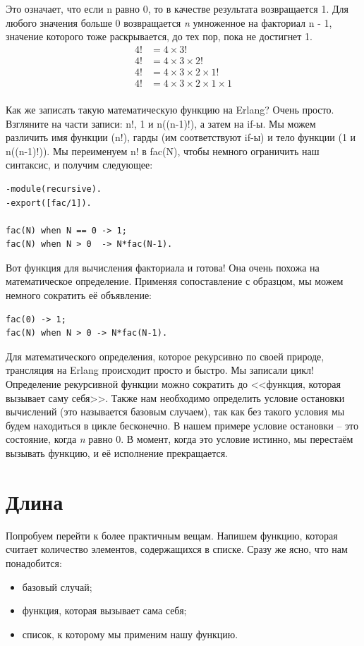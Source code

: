 \documentclass[a4paper,12pt]{report}
\newcommand{\ops}{\colorbox{lgreen}}
\begin{document}
Это означает, что если n равно 0, то в качестве результата возвращается 1. Для любого значения больше 0 возвращается \emph{n} умноженное на факториал \ops{n - 1}, значение которого тоже раскрывается, до тех пор, пока не достигнет 1.
\begin{align*}
4! &= 4 \times 3! \\
4! &= 4 \times 3 \times 2! \\
4! &= 4 \times 3 \times 2 \times 1! \\
4! &= 4 \times 3 \times 2 \times 1 \times 1 \\
\end{align*}

Как же записать такую математическую функцию на Erlang? Очень просто. Взгляните на части записи: \ops{n!}, 1 и \ops{n((n-1)!)}, а затем на \ops{if}\--ы. Мы можем различить имя функции (\ops{n!}), гарды (им соответствуют \ops{if}\--ы) и тело функции (1 и \ops{n((n-1)!)}). Мы переименуем \ops{n!} в \ops{fac(N)}, чтобы немного ограничить наш синтаксис, и получим следующее:
\begin{lstlisting}[style=erlang]
-module(recursive).
-export([fac/1]).
 
fac(N) when N == 0 -> 1;
fac(N) when N > 0  -> N*fac(N-1).
\end{lstlisting}

Вот функция для вычисления факториала и готова! Она очень похожа на математическое определение. Применяя сопоставление с образцом, мы можем немного сократить её объявление:
\begin{lstlisting}[style=erlang]
fac(0) -> 1;
fac(N) when N > 0 -> N*fac(N-1).
\end{lstlisting}

Для математического определения, которое рекурсивно по своей природе, трансляция на Erlang происходит просто и быстро. Мы записали цикл! Определение рекурсивной функции можно сократить до <<функция, которая вызывает саму себя>>. Также нам необходимо определить условие остановки вычислений (это называется базовым случаем), так как без такого условия мы будем находиться в цикле бесконечно. В нашем примере условие остановки \--- это состояние, когда \emph{n} равно 0. В момент, когда это условие истинно, мы перестаём вызывать функцию, и её исполнение прекращается. 
\section{Длина}
\label{length}
Попробуем перейти к более практичным вещам. Напишем функцию, которая считает количество элементов, содержащихся в списке. Сразу же ясно, что нам понадобится:\\
\begin{itemize}
\item базовый случай;
\item функция, которая вызывает сама себя;
\item список, к которому мы применим нашу функцию.
\end{itemize}
\end{document}
